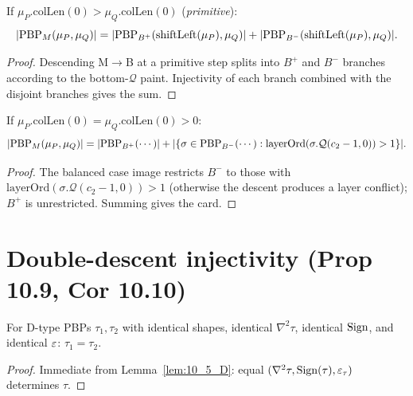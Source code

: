\begin{proposition}
  \label{prop:10_8_M_prim}
  \leanok
  If $\mu_P.\mathrm{colLen}(0) > \mu_Q.\mathrm{colLen}(0)$ (\emph{primitive}):
  \[ |\mathrm{PBP}_M(\mu_P, \mu_Q)| = |\mathrm{PBP}_{B^+}(\mathrm{shiftLeft}(\mu_P), \mu_Q)| + |\mathrm{PBP}_{B^-}(\mathrm{shiftLeft}(\mu_P), \mu_Q)|. \]
\end{proposition}
\begin{proof}
  \leanok
  Descending M$\to$B at a primitive step splits into $B^+$ and $B^-$ branches according to the bottom-$\mathcal{Q}$ paint. Injectivity of each branch combined with the disjoint branches gives the sum.
\end{proof}


\begin{proposition}
  \label{prop:10_8_M_bal}
  \leanok
  If $\mu_P.\mathrm{colLen}(0) = \mu_Q.\mathrm{colLen}(0) > 0$:
  \[ |\mathrm{PBP}_M(\mu_P, \mu_Q)| = |\mathrm{PBP}_{B^+}(\cdots)| + |\{\sigma \in \mathrm{PBP}_{B^-}(\cdots) : \mathrm{layerOrd}(\sigma.\mathcal{Q}(c_2 - 1, 0)) > 1\}|. \]
\end{proposition}
\begin{proof}
  \leanok
  The balanced case image restricts $B^-$ to those with $\mathrm{layerOrd}(\sigma.\mathcal{Q}(c_2 - 1, 0)) > 1$ (otherwise the descent produces a layer conflict); $B^+$ is unrestricted. Summing gives the card.
\end{proof}


\chapter{Double-descent injectivity (Prop 10.9, Cor 10.10)}
\label{chap:ddescent}

\begin{proposition}
  \label{prop:10_9_D}
  \leanok
  For D-type PBPs $\tau_1, \tau_2$ with identical shapes, identical $\nabla^2\tau$, identical $\mathrm{Sign}$, and identical $\varepsilon$: $\tau_1 = \tau_2$.
\end{proposition}
\begin{proof}
  \leanok
  Immediate from Lemma~\ref{lem:10_5_D}: equal $(\nabla^2\tau, \mathrm{Sign}(\tau), \varepsilon_\tau)$ determines $\tau$.
\end{proof}


